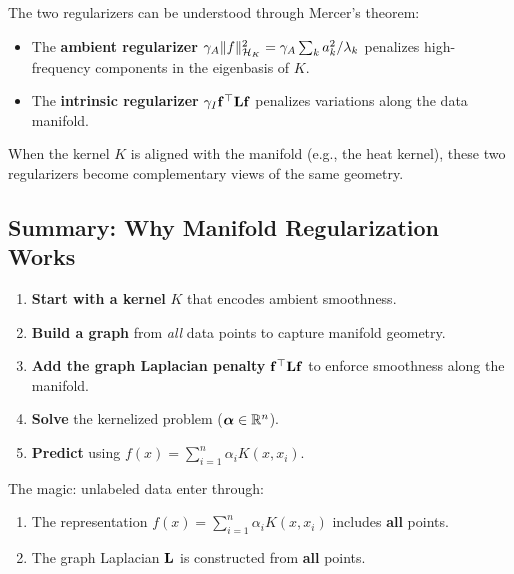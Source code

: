 \begin{notechapter}
The two regularizers can be understood through Mercer's theorem:

\begin{itemize}
  \item The \textbf{ambient regularizer} $\gamma_A \| f \|_{\mathcal{H}_K}^2 
    = \gamma_A \sum_k a_k^2/\lambda_k$ penalizes high-frequency 
    components in the eigenbasis of $K$.
  \item The \textbf{intrinsic regularizer} $\gamma_I \mathbf{f}^\top 
    \mathbf{L} \mathbf{f}$ penalizes variations along the data manifold.
\end{itemize}

When the kernel $K$ is aligned with the manifold (e.g., the heat kernel),
these two regularizers become complementary views of the same geometry.

\subsection{Summary: Why Manifold Regularization Works}
\label{rkhs:subsec:manifold_summary}

\begin{insightbox}
\begin{enumerate}
  \item \textbf{Start with a kernel} $K$ that encodes ambient smoothness.
  \item \textbf{Build a graph} from \emph{all} data points to capture 
    manifold geometry.
  \item \textbf{Add the graph Laplacian penalty} $\mathbf{f}^\top \mathbf{L} 
    \mathbf{f}$ to enforce smoothness along the manifold.
  \item \textbf{Solve} the kernelized problem ($\boldsymbol{\alpha} \in \mathbb{R}^n$).
  \item \textbf{Predict} using $f(x) = \sum_{i=1}^n \alpha_i K(x, x_i)$.
\end{enumerate}

The magic: unlabeled data enter through:
\begin{enumerate}[label=(\alph*)]
  \item The representation $f(x) = \sum_{i=1}^n \alpha_i K(x, x_i)$ 
    includes \textbf{all} points.
  \item The graph Laplacian $\mathbf{L}$ is constructed from \textbf{all} 
    points.
\end{enumerate}
\end{insightbox}


\end{notechapter}
